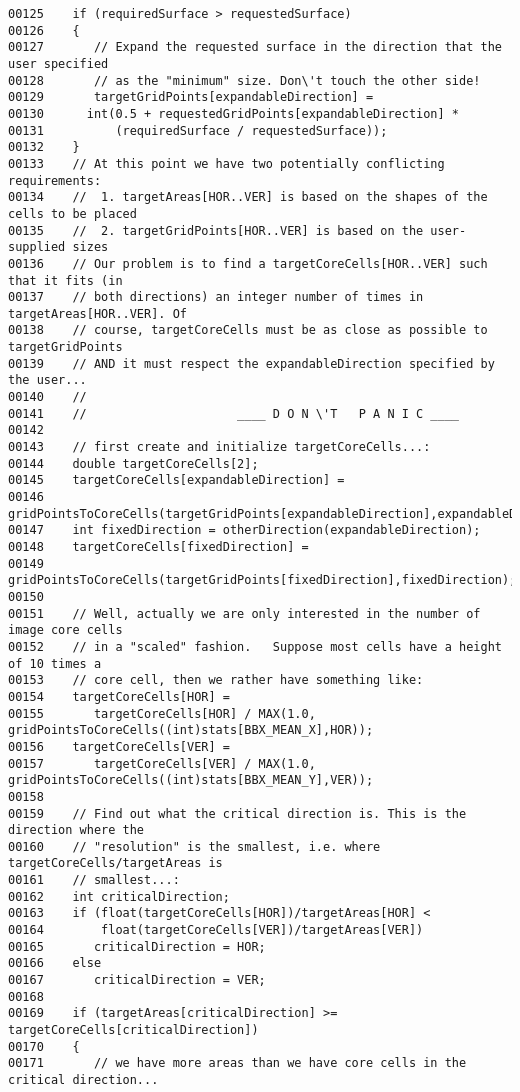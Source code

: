 \begin{verbatim}
00125    if (requiredSurface > requestedSurface)
00126    {
00127       // Expand the requested surface in the direction that the user specified
00128       // as the "minimum" size. Don\'t touch the other side!
00129       targetGridPoints[expandableDirection] = 
00130      int(0.5 + requestedGridPoints[expandableDirection] *
00131          (requiredSurface / requestedSurface));
00132    }
00133    // At this point we have two potentially conflicting requirements:
00134    //  1. targetAreas[HOR..VER] is based on the shapes of the cells to be placed
00135    //  2. targetGridPoints[HOR..VER] is based on the user-supplied sizes
00136    // Our problem is to find a targetCoreCells[HOR..VER] such that it fits (in
00137    // both directions) an integer number of times in targetAreas[HOR..VER]. Of
00138    // course, targetCoreCells must be as close as possible to targetGridPoints
00139    // AND it must respect the expandableDirection specified by the user...
00140    //
00141    //                     ____ D O N \'T   P A N I C ____
00142 
00143    // first create and initialize targetCoreCells...:
00144    double targetCoreCells[2];
00145    targetCoreCells[expandableDirection] =
00146       gridPointsToCoreCells(targetGridPoints[expandableDirection],expandableDirection);
00147    int fixedDirection = otherDirection(expandableDirection);
00148    targetCoreCells[fixedDirection] =
00149       gridPointsToCoreCells(targetGridPoints[fixedDirection],fixedDirection);
00150 
00151    // Well, actually we are only interested in the number of image core cells
00152    // in a "scaled" fashion.   Suppose most cells have a height of 10 times a
00153    // core cell, then we rather have something like:
00154    targetCoreCells[HOR] =
00155       targetCoreCells[HOR] / MAX(1.0, gridPointsToCoreCells((int)stats[BBX_MEAN_X],HOR));
00156    targetCoreCells[VER] =
00157       targetCoreCells[VER] / MAX(1.0, gridPointsToCoreCells((int)stats[BBX_MEAN_Y],VER));
00158 
00159    // Find out what the critical direction is. This is the direction where the
00160    // "resolution" is the smallest, i.e. where targetCoreCells/targetAreas is
00161    // smallest...:
00162    int criticalDirection;
00163    if (float(targetCoreCells[HOR])/targetAreas[HOR] <
00164        float(targetCoreCells[VER])/targetAreas[VER])
00165       criticalDirection = HOR;
00166    else
00167       criticalDirection = VER;
00168 
00169    if (targetAreas[criticalDirection] >= targetCoreCells[criticalDirection])
00170    {
00171       // we have more areas than we have core cells in the critical direction...

\end{verbatim}
